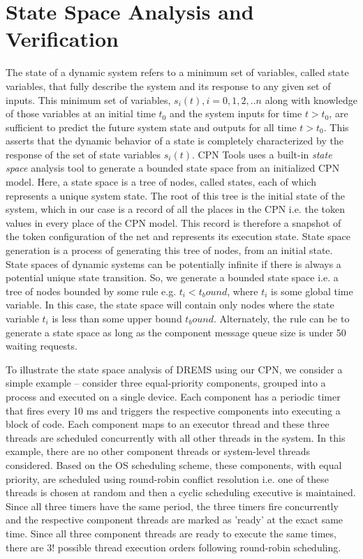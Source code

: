 \chapter{State Space Analysis and Verification}
\label{chapter:analysis}

The state of a dynamic system refers to a minimum set of variables, called state variables, that fully describe the system and its response to any given set of inputs. This minimum set of variables, $s_i(t), i=0,1,2,..n$ along with knowledge of those variables at an initial time $t_0$ and the system inputs for time $t > t_0$, are sufficient to predict the future system state and outputs for all time $t > t_0$. This asserts that the dynamic behavior of a state is completely characterized by the response of the set of state variables $s_i(t)$. CPN Tools uses a built-in \emph{state space} analysis tool to generate a bounded state space from an initialized CPN model. Here, a state space is a tree of nodes, called states, each of which represents a unique system state. The root of this tree is the initial state of the system, which in our case is a record of all the places in the CPN i.e. the token values in every place of the CPN model. This record is therefore a snapshot of the token configuration of the net and represents its execution state. State space generation is a process of generating this tree of nodes, from an initial state. State spaces of dynamic systems can be potentially infinite if there is always a potential unique state transition. So, we generate a bounded state space i.e. a tree of nodes bounded by some rule e.g. $t_i < t_bound$, where $t_i$ is some global time variable. In this case, the state space will contain only nodes where the state variable $t_i$ is less than some upper bound $t_bound$. Alternately, the rule can be to generate a state space as long as the component message queue size is under 50 waiting requests. 

To illustrate the state space analysis of DREMS using our CPN, we consider a simple example -- consider three equal-priority components, grouped into a process and executed on a single device. Each component has a periodic timer that fires every 10 ms and triggers the respective components into executing a block of code. Each component maps to an executor thread and these three threads are scheduled concurrently with all other threads in the system. In this example, there are no other component threads or system-level threads considered. Based on the OS scheduling scheme, these components, with equal priority, are scheduled using round-robin conflict resolution i.e. one of these threads is chosen at random and then a cyclic scheduling executive is maintained. Since all three timers have the same period, the three timers fire concurrently and the respective component threads are marked as 'ready' at the exact same time. Since all three component threads are ready to execute the same times, there are $3!$ possible thread execution orders following round-robin scheduling. 

